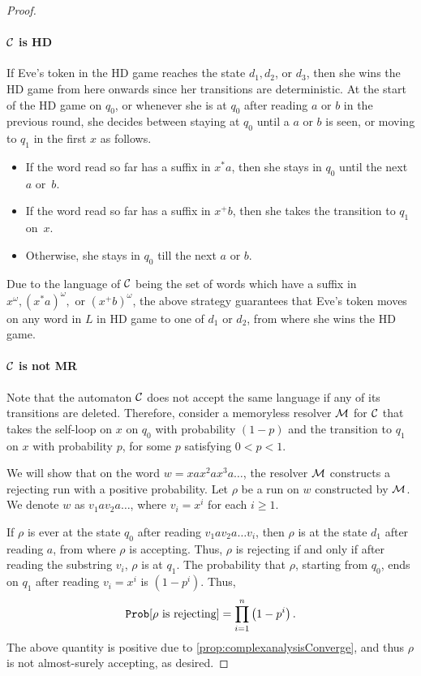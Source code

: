 \begin{proof}
    \paragraph*{$\mathcal{C}$ is HD}  If Eve's token in the HD game reaches the state $d_1,d_2$, or $d_3$, then she wins the HD game from here onwards since her transitions are deterministic. At the start of the HD game on $q_0$, or whenever she is at $q_0$ after reading $a$ or $b$ in the previous round, she decides between staying at $q_0$ until a $a$ or $b$ is seen, or moving to $q_1$ in the first $x$ as follows.
    \begin{itemize}
        \item If the word read so far has a suffix in $x^{*}a$, then she stays in $q_0$ until the next $a$ or~$b$.
        \item If the word read so far has a suffix in $x^{+}b$, then she takes the transition to $q_1$ on~$x$.
        \item Otherwise, she stays in $q_0$ till the next $a$ or $b$.
    \end{itemize}
    Due to the language of $\mathcal{C}$ being the set of words which have a suffix in $x^{\omega},(x^{*}a)^{\omega},$ or $(x^+b)^{\omega}$, the above strategy guarantees that Eve's token moves on any word in $L$ in HD game to one of $d_1$ or $d_2$, from where she wins the HD game.
    
    \paragraph*{$\mathcal{C}$ is not MR} Note that the automaton $\mathcal{C}$ does not accept the same language if any of its transitions are deleted. Therefore, consider a memoryless resolver $\mathcal{M}$ for $\mathcal{C}$ that takes the self-loop on $x$ on $q_0$ with probability $(1-p)$ and the transition to $q_1$ on $x$ with probability $p$, for some $p$ satisfying $0<p<1$. 
    
    We will show that on the word $w = x a x^2 a x^3 a \dots$, the resolver $\mathcal{M}$ constructs a rejecting run with a positive probability. Let $\rho$ be a run on $w$ constructed by $\mathcal{M}$. We denote $w$ as $v_1 a v_2 a \dots $, where $v_i=x^i$ for each $i\geq 1$.
    
    If $\rho$ is ever at the state $q_0$ after reading $v_1 a v_2 a \dots v_i$, then $\rho$ is at the state $d_1$ after reading $a$, from where $\rho$ is accepting. Thus, $\rho$ is rejecting if and only if after reading the substring $v_i$, $\rho$ is at $q_1$. The probability that $\rho$, starting from $q_0$, ends on $q_1$ after reading $v_i=x^i$ is $(1-p^i)$. Thus, 
$$
                \mathtt{Prob}[\rho \text{ is rejecting}] = \prod_{i=1}^n\left(1-p^{i}\right).
$$
The above quantity is positive due to \cref{prop:complexanalysisConverge}, and thus $\rho$ is not almost-surely accepting, as desired.
\end{proof}

